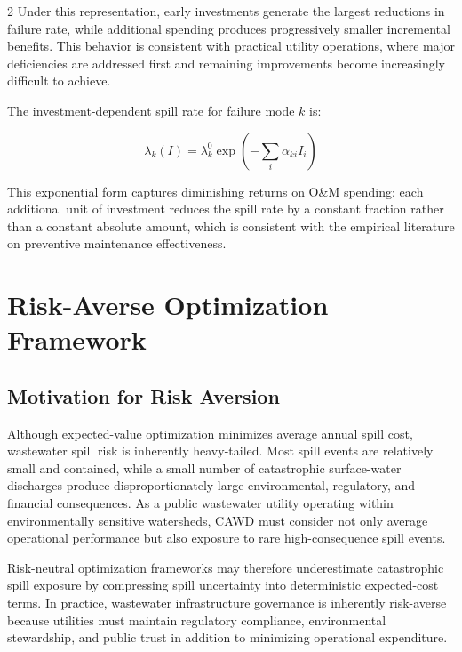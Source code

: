\documentclass[10pt]{article}
\begin{document}
\begin{multicols}{2}
Under this representation, early investments generate the largest reductions in failure rate, while additional spending produces progressively smaller incremental benefits. This behavior is consistent with practical utility operations, where major deficiencies are addressed first and remaining improvements become increasingly difficult to achieve.

The investment-dependent spill rate for failure mode $k$ is:

\[
\lambda_k(I)
=
\lambda_k^0
\exp\left(-\sum_i \alpha_{ki}I_i\right)
\]

This exponential form captures diminishing returns on O\&M spending: each
additional unit of investment reduces the spill rate by a constant
fraction rather than a constant absolute amount, which is consistent with
the empirical literature on preventive maintenance effectiveness.

\section{Risk-Averse Optimization Framework}

\subsection{Motivation for Risk Aversion}

Although expected-value optimization minimizes average annual spill cost, wastewater spill risk is inherently heavy-tailed. Most spill events are relatively small and contained, while a small number of catastrophic surface-water discharges produce disproportionately large environmental, regulatory, and financial consequences. As a public wastewater utility operating within environmentally sensitive watersheds, CAWD must consider not only average operational performance but also exposure to rare high-consequence spill events.

Risk-neutral optimization frameworks may therefore underestimate catastrophic spill exposure by compressing spill uncertainty into deterministic expected-cost terms. In practice, wastewater infrastructure governance is inherently risk-averse because utilities must maintain regulatory compliance, environmental stewardship, and public trust in addition to minimizing operational expenditure.



\end{multicols}
\end{document}

